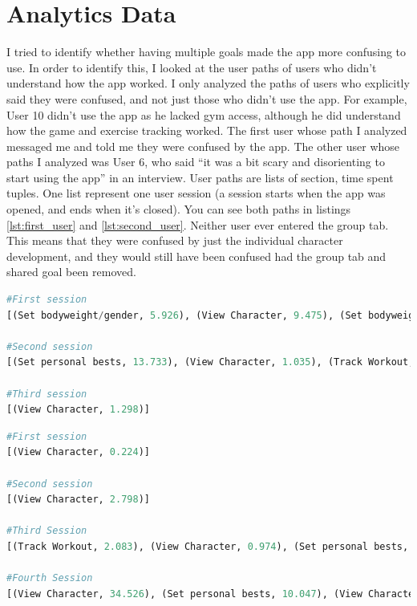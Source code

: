 \documentclass{l4proj}
\begin{document}
\section{Analytics Data}
I tried to identify whether having multiple goals made the app more confusing to use. In order to identify this, I looked at the user paths of users who didn't understand how the app worked. I only analyzed the paths of users who explicitly said they were confused, and not just those who didn't use the app. For example, User 10 didn't use the app as he lacked gym access, although he did understand how the game and exercise tracking worked. The first user whose path I analyzed messaged me and told me they were confused by the app. The other user whose paths I analyzed was User 6, who said ``it was a bit scary and disorienting to start using the app'' in an interview. User paths are lists of section, time spent tuples. One list represent one user session (a session starts when the app was opened, and ends when it's closed). You can see both paths in listings \ref{lst:first_user} and \ref{lst:second_user}. Neither user ever entered the group tab. This means that they were confused by just the individual character development, and they would still have been confused had the group tab and shared goal been removed.

\begin{lstlisting}[language=python, caption={The user paths the user who messaged me}, label=lst:first_user]
#First session
[(Set bodyweight/gender, 5.926), (View Character, 9.475), (Set bodyweight/gender, 1.286), (View Character, 5.266)]

#Second session
[(Set personal bests, 13.733), (View Character, 1.035), (Track Workout, 2.547), (View Character, 1.998)]                     

#Third session
[(View Character, 1.298)]                                                                                                    
\end{lstlisting}


\begin{lstlisting}[language=python, caption={The user paths User 6 (who was interviewed)}, label=lst:second_user]
#First session
[(View Character, 0.224)]                                                               

#Second session
[(View Character, 2.798)]                                                               

#Third Session
[(Track Workout, 2.083), (View Character, 0.974), (Set personal bests, 39.808)] 

#Fourth Session
[(View Character, 34.526), (Set personal bests, 10.047), (View Character, 3.035)]
\end{lstlisting}
\end{document}
